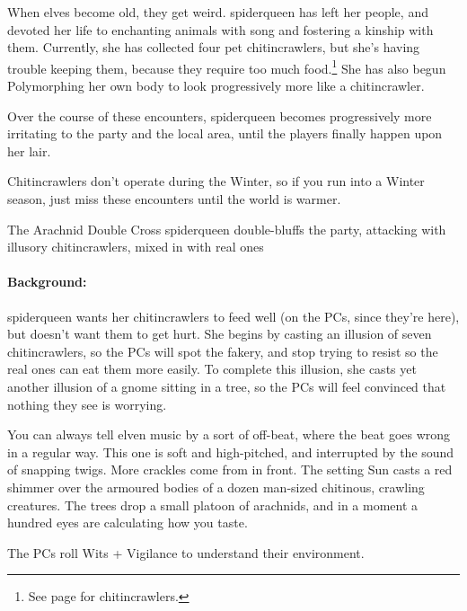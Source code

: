\begin{multicols}{2}
\noindent
When elves become old, they get weird.
\Gls{spiderqueen} has left her people, and devoted her life to enchanting animals with song and fostering a kinship with them.
Currently, she has collected four pet chitincrawlers, but she's having trouble keeping them, because they require too much food.\footnote{See page \pageref{chitincrawler} for chitincrawlers.}
She has also begun Polymorphing her own body to look progressively more like a chitincrawler.

Over the course of these encounters, \gls{spiderqueen} becomes progressively more irritating to the party and the local area, until the players finally happen upon her lair.

Chitincrawlers don't operate during the Winter, so if you run into a Winter season, just miss these encounters until the world is warmer.

{The Arachnid Double Cross}%
{\Gls{spiderqueen} double-bluffs the party, attacking with illusory chitincrawlers, mixed in with real ones}%
\label{spiderqueenssong}

\paragraph{Background:}
\Gls{spiderqueen} wants her chitincrawlers to feed well (on the PCs, since they're here), but doesn't want them to get hurt.
She begins by casting an illusion of seven chitincrawlers, so the PCs will spot the fakery, and stop trying to resist so the real ones can eat them more easily.
To complete this illusion, she casts yet another illusion of a gnome sitting in a tree, so the PCs will feel convinced that nothing they see is worrying.

\begin{boxtext}

  You can always tell elven music by a sort of off-beat, where the beat goes wrong in a regular way.
  This one is soft and high-pitched, and interrupted by the sound of snapping twigs.
  More crackles come from in front.
  The setting Sun casts a red shimmer over the armoured bodies of a dozen man-sized chitinous, crawling creatures.
  The trees drop a small platoon of arachnids, and in a moment a hundred eyes are calculating how you taste.

\end{boxtext}

The PCs roll Wits + Vigilance to understand their environment.

\begin{rollchart}


\end{rollchart}
\end{multicols}
